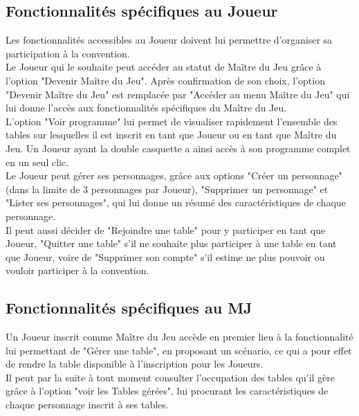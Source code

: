 \documentclass[11pt]{article}
\begin{document}
\subsection{Fonctionnalités spécifiques au Joueur} 

Les fonctionnalités accessibles au Joueur doivent lui permettre d'organiser sa participation à la convention.\\

Le Joueur qui le souhaite peut accéder au statut de Maître du Jeu grâce à l'option "Devenir Maître du Jeu". Après confirmation de son choix, l'option "Devenir Maître du Jeu" est remplacée par "Accéder au menu Maître du Jeu" qui lui donne l'accès aux fonctionnalités spécifiques du Maître du Jeu.\\

L'option "Voir programme" lui permet de visualiser rapidement l'ensemble des tables sur lesquelles il est inscrit en tant que Joueur ou en tant que Maître du Jeu. Un Joueur ayant la double casquette a ainsi accès à son programme complet en un seul clic.\\

Le Joueur peut gérer ses personnages, grâce aux options "Créer un personnage" (dans la limite de 3 personnages par Joueur), "Supprimer un personnage" et "Lister ses personnages", qui lui donne un résumé des caractéristiques de chaque personnage.\\

Il peut aussi décider de "Rejoindre une table" pour y participer en tant que Joueur, "Quitter une table" s'il ne souhaite plus participer à une table en tant que Joueur, voire de "Supprimer son compte" s'il estime ne plus pouvoir ou vouloir participer à la convention.



\subsection{Fonctionnalités spécifiques au MJ} 

Un Joueur inscrit comme Maître du Jeu accède en premier lieu à la fonctionnalité lui permettant de "Gérer une table", en proposant un scénario, ce qui a pour effet de rendre la table disponible à l'inscription pour les Joueurs.\\

Il peut par la suite à tout moment consulter l'occupation des tables qu'il gère grâce à l'option "voir les Tables gérées", lui procurant les caractéristiques de chaque personnage inscrit à ses tables.\\
\end{document}
